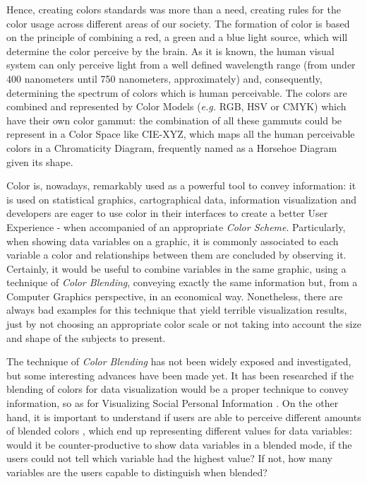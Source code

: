 %
Hence, creating colors standards was more than a need, creating rules for the color usage across different areas
of our society. The formation of color is based on the principle of combining a red, a green and a blue light
source, which will determine the color perceive by the brain. As it is known, the human visual system can only
perceive light from a well defined wavelength range (from under 400 nanometers until 750 nanometers, approximately)
and, consequently, determining the spectrum of colors which is human perceivable. The colors are combined and
represented by Color Models (\emph{e.g.} RGB, HSV or CMYK) which have their own color gammut: the combination
of all these gammuts could be represent in a Color Space like CIE-XYZ, which maps all the human perceivable
colors in a Chromaticity Diagram, frequently named as a Horsehoe Diagram given its shape. \par
%
Color is, nowadays, remarkably used as a powerful tool to convey information: it is used on statistical graphics,
cartographical data, information visualization and developers are eager to use color in their interfaces to
create a better User Experience - when accompanied of an appropriate \emph{Color Scheme}. Particularly, when
showing data variables on a graphic, it is commonly associated to each variable a color and relationships between
them are concluded by observing it. Certainly, it would be useful to combine variables in the same graphic, using
a technique of \emph{Color Blending}, conveying exactly the same information but, from a Computer Graphics
perspective, in an economical way. Nonetheless, there are always bad examples for this technique that yield
terrible visualization results, just by not choosing an appropriate color scale or not taking into account the size
and shape of the subjects to present. \par
%
The technique of \emph{Color Blending} has not been widely exposed and investigated, but some interesting advances
have been made yet. It has been researched if the blending of colors for data visualization \cite{Gama20141} would
be a proper technique to convey information, so as for Visualizing Social Personal Information \cite{Gama20143}.
On the other hand, it is important to understand if users are able to perceive different amounts of blended colors
\cite{Gama20142}, which end up representing different values for data variables: would it be counter-productive to
show data variables in a blended mode, if the users could not tell which variable had the highest value? If not,
how many variables are the users capable to distinguish when blended? \par

